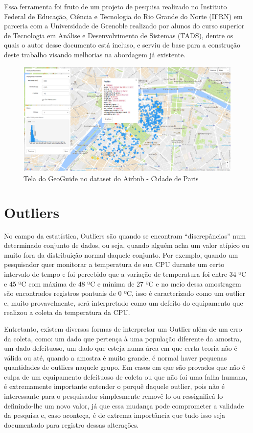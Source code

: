 Essa ferramenta foi fruto de um projeto de pesquisa realizado no Instituto Federal de Educação, Ciência e Tecnologia do Rio Grande do Norte (IFRN) em parceria com a Universidade de Grenoble realizado por alunos do curso superior de Tecnologia em Análise e Desenvolvimento de Sistemas (TADS), dentre os quais o autor desse documento está incluso, e serviu de base para a construção deste trabalho visando melhorias na abordagem já existente.

\begin{figure}[t]
	\centering
	\includegraphics[width=\textwidth]{images/geoguide-example-airbnb}
	\caption{Tela do GeoGuide no dataset do Airbnb - Cidade de Paris}
	\label{fig:geoguide-example-airbnb}
	\vspace{-10pt}
\end{figure}

\section{Outliers}

No campo da estatística, Outliers são quando se encontram ``discrepâncias'' num determinado conjunto de dados, ou seja, quando alguém acha um valor atípico ou muito fora da distribuição normal daquele conjunto. Por exemplo, quando um pesquisador quer monitorar a temperatura de sua CPU durante um certo intervalo de tempo e foi percebido que a variação de temperatura foi entre 34 ºC e 45 ºC com máxima de 48 ºC e mínima de 27 ºC e no meio dessa amostragem são encontrados registros pontuais de 0 ºC, isso é caracterizado como um outlier e, muito provavelmente, será interpretado como um defeito do equipamento que realizou a coleta da temperatura da CPU.

Entretanto, existem diversas formas de interpretar um Outlier além de um erro da coleta, como: um dado que pertença à uma população diferente da amostra, um dado defeituoso, um dado que esteja numa área em que certa teoria não é válida ou até, quando a amostra é muito grande, é normal haver pequenas quantidades de outliers naquele grupo. Em casos em que são provados que não é culpa de um equipamento defeituoso de coleta ou que não foi uma falha humana, é extremamente importante entender o porquê daquele outlier, pois não é interessante para o pesquisador simplesmente removê-lo ou ressignificá-lo definindo-lhe um novo valor, já que essa mudança pode comprometer a validade da pesquisa \cite{kjae:2017} e, caso aconteça, é de extrema importância que tudo isso seja documentado para registro dessas alterações.

